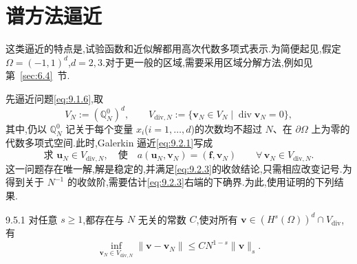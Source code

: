 \section{谱方法逼近}\label{sec:9.5}

这类逼近的特点是,试验函数和近似解都用高次代数多项式表示.为简便起见,假定 \(\Omega=(-1,1)^d\),\(d=2,3\).对于更一般的区域,需要采用区域分解方法,例如见第~\ref{sec:6.4}~节.

先逼近问题\eqref{eq:9.1.6},取
\begin{equation}\label{eq:9.5.1}
  V_N:=(\mathbb Q_N^0)^d,\qquad
  V_{\mathrm{div},N}:=\{\boldsymbol{v}_N\in V_N\mid\operatorname{div}\boldsymbol{v}_N=0\},
\end{equation}
其中,仍以 \(\mathbb Q_N^0\) 记关于每个变量 \(x_i\)(\(i=1,\ldots,d\))的次数均不超过 \(N\)、在 \(\partial\Omega\) 上为零的代数多项式空间.此时,Galerkin 逼近\eqref{eq:9.2.1}写成
\begin{equation}\label{eq:9.5.2}
  \text{求 }\boldsymbol{u}_N\in V_{\mathrm{div},N},\quad\text{使}\quad
      a(\boldsymbol{u}_N,\boldsymbol{v}_N)=(\boldsymbol{f},\boldsymbol{v}_N)
       \qquad\forall\,\boldsymbol{v}_N\in V_{\mathrm{div},N}.
\end{equation}
这一问题存在唯一解,解是稳定的,并满足\eqref{eq:9.2.3}的收敛结论,只需相应改变记号.为得到关于 \(N^{-1}\) 的收敛阶,需要估计\eqref{eq:9.2.3}右端的下确界.为此,使用证明的下列结果.

\begin{theorem}[]{9.5.1}
对任意 \(s\ge1\),都存在与 \(N\) 无关的常数 \(C\),使对所有 \(\boldsymbol{v}\in(H^s(\Omega))^d\cap V_{\mathrm{div}}\),有
\begin{equation}\label{eq:9.5.3}
  \inf_{\boldsymbol{v}_N\in V_{\mathrm{div},N}}\|\boldsymbol{v}-\boldsymbol{v}_N\|
    \le CN^{1-s}\|\boldsymbol{v}\|_s.
\end{equation}
\end{theorem}

